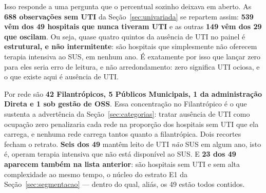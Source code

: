 Isso responde a uma pergunta que o percentual sozinho deixava em aberto. As
\textbf{688 observações sem UTI} da Seção~\ref{sec:univariada} se repartem
assim: \textbf{539 vêm dos 49 hospitais que nunca tiveram UTI} e as outras
\textbf{149 vêm dos 29 que oscilam}. Ou seja, quase quatro quintos da
ausência de UTI no painel é \textbf{estrutural, e não intermitente}: são
hospitais que simplesmente não oferecem terapia intensiva ao SUS, em nenhum
ano. É exatamente por isso que lançar zero para eles seria erro de leitura,
e não arredondamento: zero significa UTI ociosa, e o que existe aqui é
ausência de UTI.

Por rede são \textbf{42 Filantrópicos, 5 Públicos Municipais, 1 da
administração Direta e 1 sob gestão de OSS}. Essa concentração no
Filantrópico é o que sustenta a advertência da Seção~\ref{sec:categorias}:
tratar ausência de UTI como ocupação zero penalizaria cada rede na
proporção dos hospitais sem UTI que ela carrega, e nenhuma rede carrega
tantos quanto a filantrópica. Dois recortes fecham o retrato.
\textbf{Seis dos 49} mantêm leito de UTI \emph{não} SUS em algum ano, isto
é, operam terapia intensiva que não está disponível ao SUS. E \textbf{23
dos 49 aparecem também na lista anterior}: são hospitais sem UTI e sem alta
complexidade ao mesmo tempo, o núcleo do estrato E1 da
Seção~\ref{sec:segmentacao} --- dentro do qual, aliás, os 49 estão todos
contidos.

